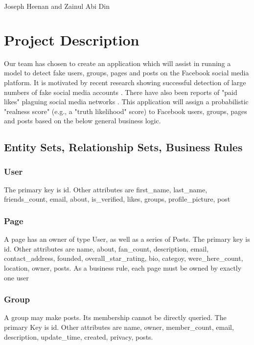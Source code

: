 \documentclass{article}
\begin{document}
\begin{center}
\begin{LARGE}{Joseph Heenan and Zainul Abi Din} \end{LARGE}
\end{center}

\section{Project Description}

Our team has chosen to create an application which will assist in running a model to detect fake users, groups, pages and posts on the Facebook social media platform. It is motivated by recent research showing successful detection of large numbers of fake social media accounts \cite{2017arXiv170102405E}. There have also been reports of "paid likes"  plaguing social media networks \cite{TheBotBubble}. This application will assign a probabilistic "realness score" (e.g., a "truth likelihood" score) to Facebook users, groups, pages and posts based on the below general business logic.

\subsection{Entity Sets, Relationship Sets, Business Rules}

\subsubsection{User}

The primary key is id. Other attributes are first_name, last_name, friends_count, email, about, is_verified, likes, groups, profile_picture, post

\subsubsection{Page}
A page has an owner of type User, as well as a series of Posts. The primary key is id. Other attributes are name, about, fan_count, description, email, contact_address, founded, overall_star_rating, bio, categoy, were_here_count, location, owner, posts. As a business rule, each page must be owned by exactly one user

\subsubsection{Group}
A group may make posts. Its membership cannot be directly queried. The primary Key is id. Other attributes are name, owner, member_count, email, description, update_time, created, privacy, posts.
\end{document}
